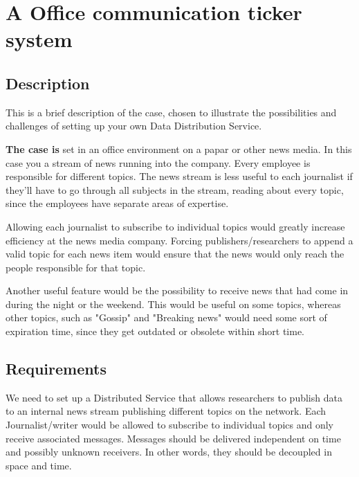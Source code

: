 
\chapter{A Office communication ticker system}

\section{Description}
This is a brief description of the case, chosen to illustrate the possibilities and challenges of setting up your own Data Distribution Service.

\textbf{The case is}
set in an office environment on a papar or other news media. In this case you a stream of news running into the company. Every employee is responsible for different topics.
The news stream is less useful to each journalist if they'll have to go through all subjects in the stream, reading about every topic, since the employees have separate areas of expertise. 

Allowing each journalist to subscribe to individual topics would greatly increase efficiency at the news media company. Forcing publishers/researchers to append a valid topic for each news item would ensure that the news would only reach the people responsible for that topic.

Another useful feature would be the possibility to receive news that had come in during the night or the weekend. This would be useful on some topics, whereas other topics, such as "Gossip" and "Breaking news" would need some sort of expiration time, since they get outdated or obsolete within short time.

\section{Requirements}
We need to set up a Distributed Service that allows researchers to publish data to an internal news stream publishing different topics on the network. Each Journalist/writer would be allowed to subscribe to individual topics and only receive associated messages.
Messages should be delivered independent on time and possibly unknown receivers. In other words, they should be decoupled in space and time.

